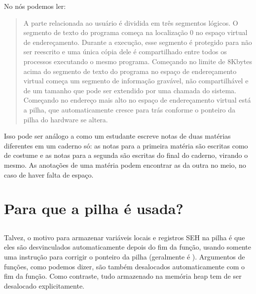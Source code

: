 No \RitchieThompsonUNIX nós podemos ler:

\begin{framed}
\begin{quotation}
A parte relacionada ao usuário é dividida em três segmentos lógicos. O segmento de texto do programa começa na localização 0 no espaço virtual de endereçamento.
Durante a execução, esse segmento é protegido para não ser reescrito e uma única cópia dele é compartilhado entre
todos os processos executando o mesmo programa.
Começando no limite de 8Kbytes acima do segmento de texto do programa no espaço de endereçamento virtual começa um segmento de informação gravável,
não compartilhável e de um tamanho que pode ser extendido por uma chamada do sistema.
Começando no endereço mais alto no espaço de endereçamento virtual está a pilha, que automaticamente cresce para trás conforme o ponteiro da pilha do hardware se altera.
\end{quotation}
\end{framed}

Isso pode ser análogo a como um estudante escreve notas de duas matérias diferentes em um caderno só:
as notas para a primeira matéria são escritas como de costume e as notas para a segunda são escritas do final do caderno,
virando o mesmo. As anotações de uma matéria podem encontrar as da outra no meio, no caso de haver falta de espaço.

\section{Para que a pilha é usada?}



\EN{}
\RU{}
\PTBR{}




\subsection{\PTBRph{}}

Talvez, o motivo para armazenar variáveis locais e registros SEH na pilha é que eles são desvinculados automaticamente depois do fim da função,
usando somente uma instrução para corrigir o ponteiro da pilha (geralmente é \ADD). Argumentos de funções, como podemos dizer, são
também desalocados automaticamente com o fim da função.
Como contraste, tudo armazenado na memória heap tem de ser desalocado explicitamente.

\EN{}
\RU{}
\PTBR{}



